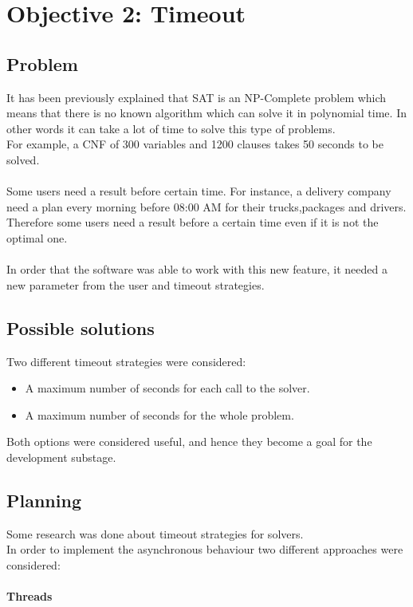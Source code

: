 \section{Objective 2: Timeout}

\subsection{Problem}
It has been previously explained that SAT is an NP-Complete problem which means that there is no known algorithm which can solve it in polynomial time. In other words it can take a lot of time to solve this type of problems. \\
For example, a CNF of 300 variables and 1200 clauses takes 50 seconds to be solved.  \\\\
Some users need a result before certain time. For instance, a delivery company need a plan every morning before 08:00 AM for their trucks,packages and drivers. Therefore some users need a result before a certain time even if it is not the optimal one.  \\\\
In order that the software was able to work with this new feature, it needed a new parameter from the user and timeout strategies.

\subsection{Possible solutions}
Two different timeout strategies were considered:  

\begin{itemize}
	\item A maximum number of seconds for each call to the solver.
	\item A maximum number of seconds for the whole problem. 
\end{itemize}
Both options were considered useful, and hence they become a goal for the development substage.   

\subsection{Planning}
Some research was done about timeout strategies for solvers.  \\
In order to implement the asynchronous behaviour two different approaches were considered:  

\paragraph{Threads}

